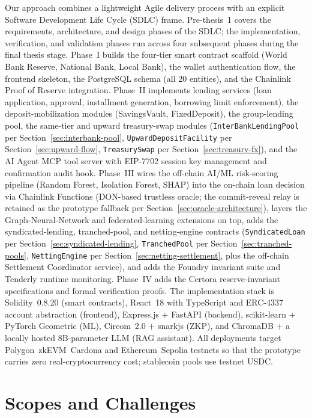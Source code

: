 \documentclass[12pt,a4paper]{report}
\begin{document}
Our approach combines a lightweight Agile delivery process with an explicit Software Development Life Cycle (SDLC) frame. Pre-thesis~1 covers the requirements, architecture, and design phases of the SDLC; the implementation, verification, and validation phases run across four subsequent phases during the final thesis stage. Phase~I builds the four-tier smart contract scaffold (World Bank Reserve, National Bank, Local Bank), the wallet authentication flow, the frontend skeleton, the PostgreSQL schema (all 20 entities), and the Chainlink Proof of Reserve integration. Phase~II implements lending services (loan application, approval, installment generation, borrowing limit enforcement), the deposit-mobilization modules (SavingsVault, FixedDeposit), the group-lending pool, the same-tier and upward treasury-swap modules (\texttt{InterBankLendingPool} per Section~\ref{sec:interbank-pool}, \texttt{UpwardDepositFacility} per Section~\ref{sec:upward-flow}, \texttt{TreasurySwap} per Section~\ref{sec:treasury-fx}), and the AI Agent MCP tool server with EIP-7702 session key management and confirmation audit hook. Phase~III wires the off-chain AI/ML risk-scoring pipeline (Random Forest, Isolation Forest, SHAP) into the on-chain loan decision via Chainlink Functions (DON-based trustless oracle; the commit-reveal relay is retained as the prototype fallback per Section~\ref{sec:oracle-architecture}), layers the Graph-Neural-Network and federated-learning extensions on top, adds the syndicated-lending, tranched-pool, and netting-engine contracts (\texttt{SyndicatedLoan} per Section~\ref{sec:syndicated-lending}, \texttt{TranchedPool} per Section~\ref{sec:tranched-pools}, \texttt{NettingEngine} per Section~\ref{sec:netting-settlement}, plus the off-chain Settlement Coordinator service), and adds the Foundry invariant suite and Tenderly runtime monitoring. Phase~IV adds the Certora reserve-invariant specifications and formal verification proofs. The implementation stack is Solidity~0.8.20 (smart contracts), React~18 with TypeScript and ERC-4337 account abstraction (frontend), Express.js + FastAPI (backend), scikit-learn + PyTorch Geometric (ML), Circom~2.0 + snarkjs (ZKP), and ChromaDB + a locally hosted 8B-parameter LLM (RAG assistant). All deployments target Polygon~zkEVM~Cardona and Ethereum~Sepolia testnets so that the prototype carries zero real-cryptocurrency cost; stablecoin pools use testnet USDC.

\section{Scopes and Challenges}
\end{document}
